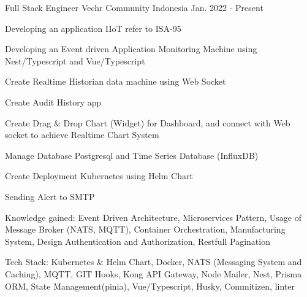 

\begin{cventries}


  \cventry
    {Full Stack Engineer} %
    {Vechr Community} %
    {Indonesia} %
    {Jan. 2022 - Present} %
    {
      \begin{cvitems} %
        \item {Developing an application IIoT refer to ISA-95}
        \item {Developing an Event driven Application Monitoring Machine using Nest/Typescript and Vue/Typescript}
        \item {Create Realtime Historian data machine using Web Socket}
        \item {Create Audit History app}
        \item {Create Drag \& Drop Chart (Widget) for Dashboard, and connect with Web socket to achieve Realtime Chart System}
        \item {Manage Database Postgresql and Time Series Database (InfluxDB)}
        \item {Create Deployment Kubernetes using Helm Chart}
        \item {Sending Alert to SMTP}
        \item {Knowledge gained: Event Driven Architecture, Microservices Pattern, Usage of Message Broker (NATS, MQTT), Container Orchestration, Manufacturing System, Design Authentication and Authorization, Restfull Pagination}
        \item {Tech Stack: Kubernetes \& Helm Chart, Docker, NATS (Messaging System and Caching), MQTT, GIT Hooks, Kong API Gateway, Node Mailer, Nest, Prisma ORM, State Management(pinia), Vue/Typescript, Husky, Commitizen, linter}
      \end{cvitems}
    }


\end{cventries}
